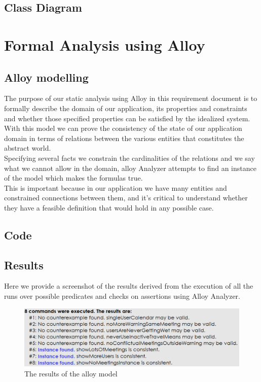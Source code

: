 \documentclass{article}
\begin{document}
\clearpage
\subsection{Class Diagram}



\clearpage
\section{Formal Analysis using Alloy}

\subsection{Alloy modelling}

The purpose of our static analysis using Alloy in this requirement document is to formally describe the domain of our application, its properties and constraints and whether those specified properties can be satisfied by the idealized system.
\\With this model we can prove the consistency of the state of our application domain in terms of relations between the various entities that constitutes the abstract world. 
\\Specifying several facts we constrain the cardinalities of the relations and we say what we cannot allow in the domain, alloy Analyzer attempts to find an instance of the model which makes the formulas true.
\\This is important because in our application we have many entities and constrained connections between them, and it's critical to understand whether they have a feasible definition that would hold in any possible case. 


\subsection{Code}

\texttt{}	

\clearpage
\subsection{Results}
\begin{center}
Here we provide a screenshot of the results derived from the execution of all the runs over possible predicates and checks on assertions using Alloy Analyzer.
	\begin{figure}[htp] 

\includegraphics[width=\textwidth]{alloy/material/alloyresults} 
\caption{The results of the alloy model} 
\label{fig:alloyresults} 
\end{figure} 
\end{center}
\clearpage
\end{document}
